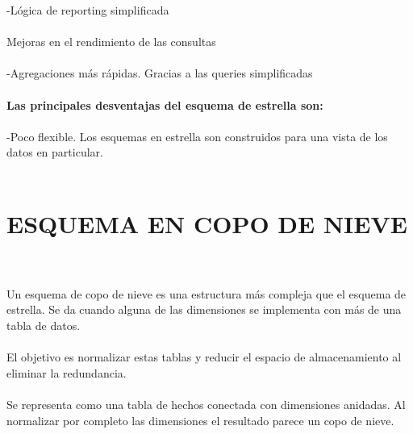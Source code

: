 -Lógica de reporting simplificada\\\\
Mejoras en el rendimiento de las consultas\\\\
-Agregaciones más rápidas. Gracias a las queries simplificadas\\\\
\textbf{Las principales desventajas del esquema de estrella son:}\\\\
-Poco flexible. Los esquemas en estrella son construidos para una vista de los datos en particular.\\\\

\section{ESQUEMA EN COPO DE NIEVE}\\\\

Un esquema de copo de nieve es una estructura más compleja que el esquema de estrella. Se da cuando alguna de las dimensiones se implementa con más de una tabla de datos.\\\\
El objetivo es normalizar estas tablas y reducir el espacio de almacenamiento al eliminar la redundancia.\\\\
Se representa como una tabla de hechos conectada con dimensiones anidadas. Al normalizar por completo las dimensiones el resultado parece un copo de nieve.\\

